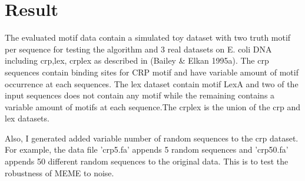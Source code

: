 \documentclass{article}
\begin{document}
\section{Result}
The evaluated motif data contain a simulated toy dataset with two truth motif per sequence for testing the algorithm and 3 real datasets on E. coli DNA including crp,lex, crplex as described in (Bailey & Elkan 1995a). The crp sequences contain binding sites for CRP motif and have variable amount of motif occurrence at each sequences. The lex dataset contain motif LexA and two of the input sequences does not contain any motif while the remaining contains a variable amount of motifs at each sequence.The crplex is the union of the crp and lex datasets.

Also, I generated added variable number of random sequences to the crp dataset. For example, the data file 'crp5.fa' appends 5 random sequences and 'crp50.fa' appends 50 different random sequences to the original data. This is to test the robustness of MEME to noise.
\end{document}
